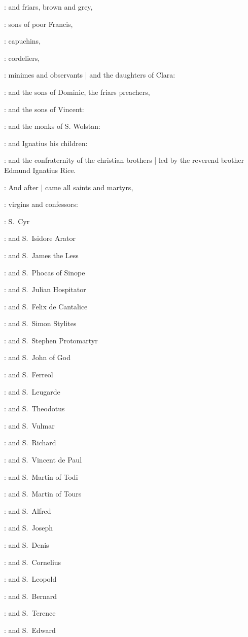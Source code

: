 :
and friars,
brown and grey,

:
sons of poor Francis,

:
capuchins,

:
cordeliers,

:
minimes and observants |
and the daughters of Clara:

:
and the sons of Dominic,
the friars preachers,

:
and the sons of Vincent:

:
and the monks of S. Wolstan:

:
and Ignatius his children:

:
and the confraternity of the christian brothers |
led by the reverend brother Edmund Ignatius Rice.

:
And after |
came all saints and martyrs,

:
virgins and confessors:

:
S.~Cyr

:
and S.~Isidore Arator

:
and S.~James the Less 

:
and S.~Phocas of Sinope 

:
and S.~Julian Hospitator 

:
and S.~Felix de Cantalice 

:
and S.~Simon Stylites 

:
and S.~Stephen Protomartyr 

:
and S.~John of God 

:
and S.~Ferreol 

:
and S.~Leugarde 

:
and S.~Theodotus 

:
and S.~Vulmar 

:
and S.~Richard 

:
and S.~Vincent de Paul 

:
and S.~Martin of Todi 

:
and S.~Martin of Tours 

:
and S.~Alfred 

:
and S.~Joseph 

:
and S.~Denis 

:
and S.~Cornelius 

:
and S.~Leopold 

:
and S.~Bernard 

:
and S.~Terence 

:
and S.~Edward 

